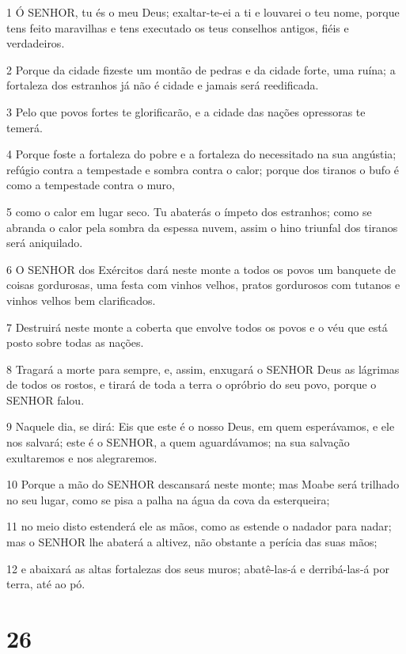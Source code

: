 \par 1 Ó SENHOR, tu és o meu Deus; exaltar-te-ei a ti e louvarei o teu nome, porque tens feito maravilhas e tens executado os teus conselhos antigos, fiéis e verdadeiros.
\par 2 Porque da cidade fizeste um montão de pedras e da cidade forte, uma ruína; a fortaleza dos estranhos já não é cidade e jamais será reedificada.
\par 3 Pelo que povos fortes te glorificarão, e a cidade das nações opressoras te temerá.
\par 4 Porque foste a fortaleza do pobre e a fortaleza do necessitado na sua angústia; refúgio contra a tempestade e sombra contra o calor; porque dos tiranos o bufo é como a tempestade contra o muro,
\par 5 como o calor em lugar seco. Tu abaterás o ímpeto dos estranhos; como se abranda o calor pela sombra da espessa nuvem, assim o hino triunfal dos tiranos será aniquilado.
\par 6 O SENHOR dos Exércitos dará neste monte a todos os povos um banquete de coisas gordurosas, uma festa com vinhos velhos, pratos gordurosos com tutanos e vinhos velhos bem clarificados.
\par 7 Destruirá neste monte a coberta que envolve todos os povos e o véu que está posto sobre todas as nações.
\par 8 Tragará a morte para sempre, e, assim, enxugará o SENHOR Deus as lágrimas de todos os rostos, e tirará de toda a terra o opróbrio do seu povo, porque o SENHOR falou.
\par 9 Naquele dia, se dirá: Eis que este é o nosso Deus, em quem esperávamos, e ele nos salvará; este é o SENHOR, a quem aguardávamos; na sua salvação exultaremos e nos alegraremos.
\par 10 Porque a mão do SENHOR descansará neste monte; mas Moabe será trilhado no seu lugar, como se pisa a palha na água da cova da esterqueira;
\par 11 no meio disto estenderá ele as mãos, como as estende o nadador para nadar; mas o SENHOR lhe abaterá a altivez, não obstante a perícia das suas mãos;
\par 12 e abaixará as altas fortalezas dos seus muros; abatê-las-á e derribá-las-á por terra, até ao pó.

\chapter{26}

